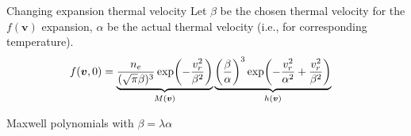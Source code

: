 \documentclass[mathserif, aspectratio=169]{beamer}
\newcommand{\vect}[1]{\boldsymbol{#1}}
\newcommand{\of}[1]{\mleft( #1 \mright)}
\begin{document}
\begin{frame}{Changing expansion thermal velocity}
	Let $\beta$ be the chosen thermal velocity for the $f(\vect{v})$ expansion, $\alpha$ be the actual thermal velocity (i.e., for corresponding temperature).
	\begin{align*}
		f(\vect{v},0) &= \underbrace{\frac{n_e}{(\sqrt{\pi}\beta)^3} \exp\of{-\frac{v_r^2}{\beta^2}}}_{M(\vect{v})} \underbrace{\left(\frac{\beta}{\alpha}\right)^3 \exp\of{-\frac{v_r^2}{\alpha^2} + \frac{v_r^2}{\beta^2}}}_{h(\vect{v})} 
	\end{align*}
\end{frame}

\begin{frame}{Maxwell polynomials with $\beta=\lambda \alpha$}
	\begin{center}
\end{center}
\end{frame}
\end{document}
